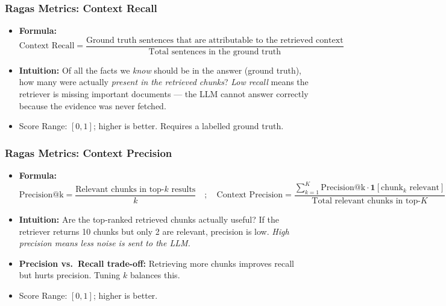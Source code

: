 \begin{frame}[fragile]
\frametitle{Ragas Metrics: Context Recall}
\begin{itemize}
    \item \textbf{Formula:}
    \[
      \text{Context Recall} = \frac{\text{Ground truth sentences that are attributable to the retrieved context}}{\text{Total sentences in the ground truth}}
    \]
    \item \textbf{Intuition:} Of all the facts we \textit{know} should be in the answer (ground truth), how many were actually \textit{present in the retrieved chunks}?
    \newline \textit{Low recall} means the retriever is missing important documents --- the LLM cannot answer correctly because the evidence was never fetched.
    \item Score Range: $[0, 1]$; higher is better. Requires a labelled ground truth.
\end{itemize}
\end{frame}

\begin{frame}[fragile]
\frametitle{Ragas Metrics: Context Precision}
\begin{itemize}
    \item \textbf{Formula:}
    \[
      \text{Precision@k} = \frac{\text{Relevant chunks in top-}k\text{ results}}{k}
      \quad;\quad
      \text{Context Precision} = \frac{\sum_{k=1}^{K} \text{Precision@k} \cdot \mathbf{1}[\text{chunk}_k \text{ relevant}]}{\text{Total relevant chunks in top-}K}
    \]
    \item \textbf{Intuition:} Are the top-ranked retrieved chunks actually useful? If the retriever returns 10 chunks but only 2 are relevant, precision is low. \textit{High precision means less noise is sent to the LLM.}
    \item \textbf{Precision vs.\ Recall trade-off:} Retrieving more chunks improves recall but hurts precision. Tuning $k$ balances this.
    \item Score Range: $[0, 1]$; higher is better.
\end{itemize}
\end{frame}


